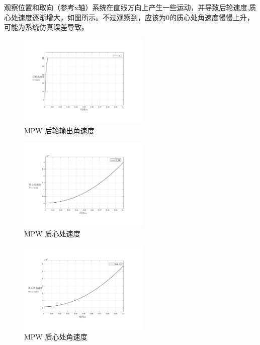 \begin{itemize}
	观察位置和取向（参考x轴）系统在直线方向上产生一些运动，并导致后轮速度,质心处速度逐渐增大，如图所示。不过观察到，应该为0的质心处角速度慢慢上升，可能为系统仿真误差导致。
	\begin{figure}[!h]
		\centering
		\includegraphics[width=0.56\textwidth]{fig/simulation/MPW_wL.pdf}
		\caption{MPW 后轮输出角速度}\label{MPW_wL}
	\end{figure}
	\begin{figure}[!h]
		\centering
		\includegraphics[width=0.56\textwidth]{fig/simulation/MPW_vCG.pdf}
		\caption{MPW 质心处速度}\label{MPW_vCG}
	\end{figure}
	\begin{figure}[!h]
		\centering
		\includegraphics[width=0.56\textwidth]{fig/simulation/MPW_wCG.pdf}
		\caption{MPW 质心处角速度}\label{MPW_wCG}
	\end{figure}
	

\end{itemize}
